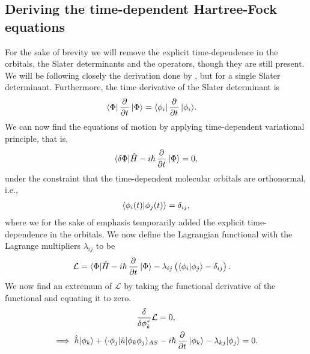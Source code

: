     \subsection{Deriving the time-dependent Hartree-Fock equations}
        For the sake of brevity we will remove the explicit time-dependence in
        the orbitals, the Slater determinants and the operators, though they are
        still present.
        We will be following closely the derivation done by
        \citeauthor{hochstuhl2014time} \cite{hochstuhl2014time}, but for a
        single Slater determinant.
        Furthermore, the time derivative of the Slater determinant is
        \begin{align}
            \bra{\Phi}\dpd{}{t}\ket{\Phi}
            &= \bra{\phi_i}\dpd{}{t}\ket{\phi_i}.
        \end{align}
        We can now find the equations of motion by applying time-dependent
        variational principle, that is,
        \begin{align}
            \bra{\delta\Phi}\hat{H} - i\hslash\dpd{}{t}\ket{\Phi} = 0,
        \end{align}
        under the constraint that the time-dependent molecular orbitals are
        orthonormal, i.e.,
        \begin{align}
            \langle \phi_i(t) | \phi_j(t) \rangle = \delta_{ij},
        \end{align}
        where we for the sake of emphasis temporarily added the explicit
        time-dependence in the orbitals. We now define the Lagrangian functional
        with the Lagrange multipliers $\lambda_{ij}$ to be
        \begin{align}
            \mathcal{L}
            &= \bra{\Phi}\hat{H} - i\hslash\dpd{}{t}\ket{\Phi}
            - \lambda_{ij}\para{
                \braket{\phi_i}{\phi_j} - \delta_{ij}
            }.
        \end{align}
        We now find an extremum of $\mathcal{L}$ by taking the functional
        derivative of the functional and equating it to zero.
        \begin{gather}
            \dfd{\phi_k^{*}}\mathcal{L} = 0, \\
            \implies
            \hat{h}\ket{\phi_k}
            + \bra{\cdot\phi_j}\hat{u}\ket{\phi_k\phi_j}_{AS}
            - i\hslash\dpd{}{t}\ket{\phi_k}
            - \lambda_{kj}\ket{\phi_j} = 0.
            \label{eq:extremum_lagrangian}
        \end{gather}
